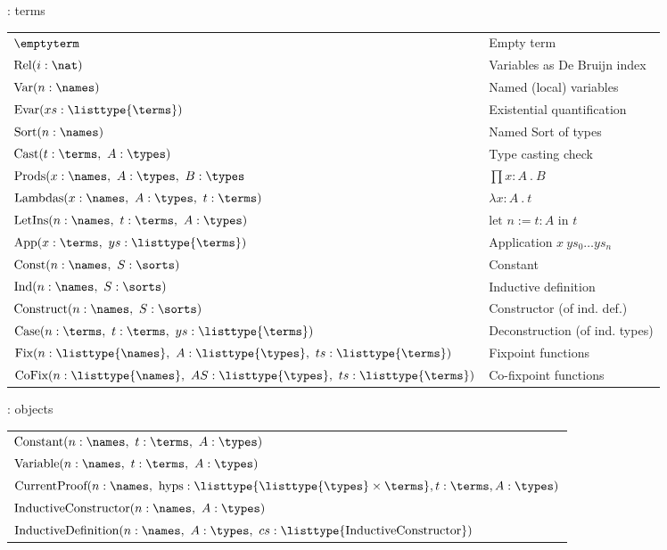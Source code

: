 \documentclass[department=ds, notes={hide notes}, slidesperpage=1]{beamerruhuisstijl}
\begin{document}
\begin{frame}{\pcic: terms}
	\vspace{-0.7em}
	\begin{tabular}{ll}
		$\emptyterm$                                        & Empty term \\
		$\text{Rel}(i:\nat)$                       & Variables as De Bruijn index \\
		$\text{Var}(n:\names)$                     & Named (local) variables \\
		$\text{Evar}(xs:\listtype{\terms}) $        & Existential quantification \\
		$\text{Sort}(n:\names)$                    & Named Sort of types \\
		$\text{Cast}(t:\terms,~ A:\types)$ & Type casting check \\
		$\text{Prods}(x:\names,~ A:\types,~ B:\types$ & $\prod x:A ~.~ B$ \\
		$\text{Lambdas}(x:\names,~ A:\types,~ t:\terms)$   & $\lambda x:A ~.~ t$ \\
		$\text{LetIns}(n:\names,~ t:\terms,~ A:\types)$    & $\text{let~} n := t : A \text{~in~} t$ \\
		$\text{App}(x:\terms,~ ys:\listtype{\terms})$ & Application $x~ys_0 \ldots ys_n$ \\
		$\text{Const}(n:\names,~ S:\sorts)$ & Constant \\
		$\text{Ind}(n:\names,~ S:\sorts)$  & Inductive definition \\
		$\text{Construct}(n:\names,~ S:\sorts)$ & Constructor (of ind. def.) \\
		$\text{Case}(n:\terms,~ t:\terms,~ ys:\listtype{\terms})$ & Deconstruction (of ind. types) \\
		$\text{Fix}(n:\listtype{\names},~ A:\listtype{\types},~ ts:\listtype{\terms})$ & Fixpoint functions \\
		$\text{CoFix}(n:\listtype{\names},~ AS:\listtype{\types},~ ts:\listtype{\terms})$ & Co-fixpoint functions \\
	\end{tabular}
\end{frame}

\begin{frame}{\pcic: objects}
	\begin{tabular}{l}
		$\text{Constant}(n:\names,~ t:\terms,~ A:\types)$ \\
		$\text{Variable}(n:\names,~ t:\terms,~ A:\types)$ \\
		$\text{CurrentProof}(n:\names,~ \text{hyps}:\listtype{\listtype{\types} \times \terms}, t:\terms, A:\types)$ \\
		$\text{InductiveConstructor}(n:\names,~ A:\types)$ \\
		$\text{InductiveDefinition}(n:\names,~ A:\types,~ cs:\listtype{\text{InductiveConstructor}})$
	\end{tabular}
\end{frame}
\end{document}
